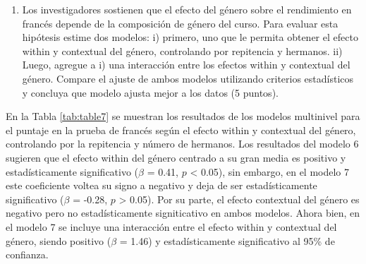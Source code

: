 \documentclass[
  12pt,
  a4paper,
]{article}
\providecommand{\tightlist}{%
  \setlength{\itemsep}{0pt}\setlength{\parskip}{0pt}}
\begin{document}
\begin{enumerate}
\def\labelenumi{\alph{enumi})}
\setcounter{enumi}{1}
\tightlist
\item
  Los investigadores sostienen que el efecto del género sobre el rendimiento en francés depende de la composición de género del curso. Para evaluar esta hipótesis estime dos modelos: i) primero, uno que le permita obtener el efecto within y contextual del género, controlando por repitencia y hermanos. ii) Luego, agregue a i) una interacción entre los efectos within y contextual del género. Compare el ajuste de ambos modelos utilizando criterios estadísticos y concluya que modelo ajusta mejor a los datos (5 puntos).
\end{enumerate}

En la Tabla \ref{tab:table7} se muestran los resultados de los modelos multinivel para el puntaje en la prueba de francés según el efecto within y contextual del género, controlando por la repitencia y número de hermanos. Los resultados del modelo 6 sugieren que el efecto within del género centrado a su gran media es positivo y estadísticamente significativo (\(\beta\) = 0.41, \(p\) \textless{} 0.05), sin embargo, en el modelo 7 este coeficiente voltea su signo a negativo y deja de ser estadísticamente significativo (\(\beta\) = -0.28, \(p\) \textgreater{} 0.05). Por su parte, el efecto contextual del género es negativo pero no estadísticamente signiticativo en ambos modelos. Ahora bien, en el modelo 7 se incluye una interacción entre el efecto within y contextual del género, siendo positivo (\(\beta\) = 1.46) y estadísticamente significativo al 95\% de confianza.
\end{document}
